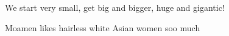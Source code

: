 \documentclass{article}
\begin{document}
\tiny We \scriptsize start \footnotesize very \small small, \normalsize get \large big and \LARGE bigger, \huge huge and \Huge gigantic! \\

\normalsize

{\tiny Moamen} {\scriptsize likes} {\footnotesize hairless} {\small white} {\normalsize Asian} {\large women} {\LARGE so}{\huge o} {\Huge much}
\end{document}

